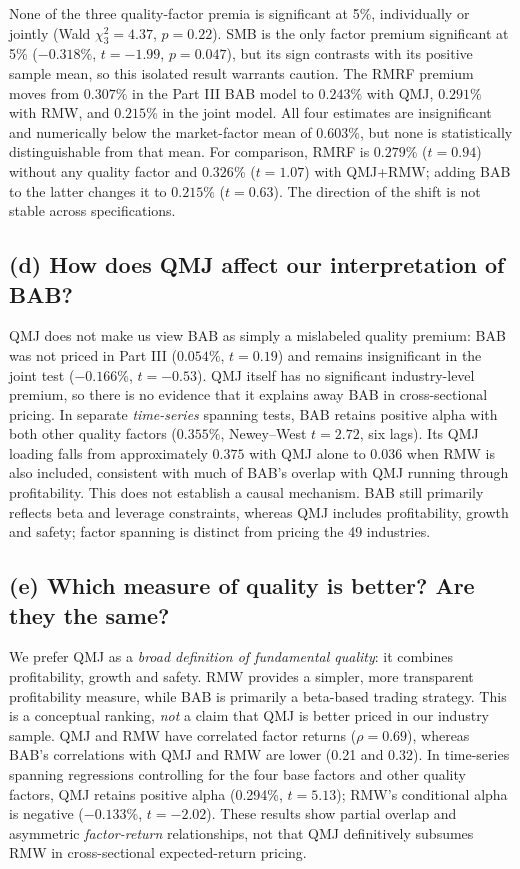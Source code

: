 \noindent None of the three quality-factor premia is significant at 5\%, individually
or jointly (Wald $\chi^2_3=4.37$, $p=0.22$). SMB is the only factor premium
significant at 5\% ($-0.318\%$, $t=-1.99$, $p=0.047$), but its sign
contrasts with its positive sample mean, so this isolated result warrants caution. The RMRF premium moves from $0.307\%$ in the
Part III BAB model to $0.243\%$ with QMJ, $0.291\%$ with RMW, and $0.215\%$
in the joint model. All four estimates are insignificant and numerically below
the market-factor mean of $0.603\%$, but none is statistically distinguishable
from that mean. For comparison, RMRF is $0.279\%$ ($t=0.94$) without any
quality factor and $0.326\%$ ($t=1.07$) with QMJ+RMW; adding BAB to the
latter changes it to $0.215\%$ ($t=0.63$). The direction of the shift is
not stable across specifications.

\subsection*{(d) How does QMJ affect our interpretation of BAB?}
QMJ does not make us view BAB as simply a mislabeled quality premium: BAB was
not priced in Part III ($0.054\%$, $t=0.19$) and remains insignificant in the
joint test ($-0.166\%$, $t=-0.53$). QMJ itself has no significant
industry-level premium, so there is no evidence that it explains away BAB in
cross-sectional pricing. In separate \emph{time-series} spanning tests, BAB
retains positive alpha with both other quality factors ($0.355\%$,
Newey--West $t=2.72$, six lags). Its QMJ loading falls from approximately
$0.375$ with QMJ alone to $0.036$ when RMW is also included, consistent with
much of BAB's overlap with QMJ running through profitability. This does not
establish a causal mechanism. BAB still primarily reflects beta and leverage
constraints, whereas QMJ includes profitability, growth and safety; factor
spanning is distinct from pricing the 49 industries.

\subsection*{(e) Which measure of quality is better? Are they the same?}
We prefer QMJ as a \emph{broad definition of fundamental quality}: it combines
profitability, growth and safety. RMW provides a simpler, more transparent
profitability measure, while BAB is primarily a beta-based trading strategy.
This is a conceptual ranking, \emph{not} a claim that QMJ is better priced in
our industry sample. QMJ and RMW have correlated factor returns ($\rho=0.69$),
whereas BAB's correlations with QMJ and RMW are lower (0.21 and 0.32).
In time-series spanning regressions controlling for the four base factors and
other quality factors, QMJ retains positive alpha (0.294\%, $t=5.13$); RMW's
conditional alpha is negative ($-0.133\%$, $t=-2.02$). These results show
partial overlap and asymmetric \emph{factor-return} relationships, not that
QMJ definitively subsumes RMW in cross-sectional expected-return pricing.

